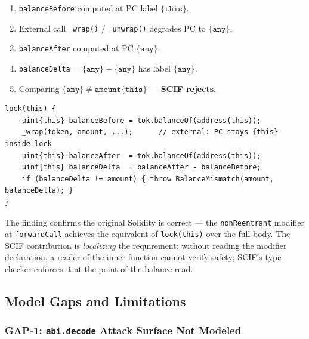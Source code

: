 \documentclass[11pt,a4paper]{article}
\begin{document}
\begin{enumerate}
  \item \texttt{balanceBefore} computed at PC label $\{\texttt{this}\}$.
  \item External call \texttt{\_wrap()} / \texttt{\_unwrap()} degrades PC to
    $\{\texttt{any}\}$.
  \item \texttt{balanceAfter} computed at PC $\{\texttt{any}\}$.
  \item \texttt{balanceDelta} = $\{\texttt{any}\} - \{\texttt{any}\}$ has
    label $\{\texttt{any}\}$.
  \item Comparing $\{\texttt{any}\} \neq \texttt{amount}\{\texttt{this}\}$ ---
    \textbf{SCIF rejects}.
\end{enumerate}

\begin{lstlisting}[style=scifstyle,caption={Lock scope must wrap the full read-call-read-check sequence.}]
lock(this) {
    uint{this} balanceBefore = tok.balanceOf(address(this));
    _wrap(token, amount, ...);      // external: PC stays {this} inside lock
    uint{this} balanceAfter  = tok.balanceOf(address(this));
    uint{this} balanceDelta  = balanceAfter - balanceBefore;
    if (balanceDelta != amount) { throw BalanceMismatch(amount, balanceDelta); }
}
\end{lstlisting}

The finding confirms the original Solidity is correct --- the \texttt{nonReentrant}
modifier at \texttt{forwardCall} achieves the equivalent of \texttt{lock(this)}
over the full body. The SCIF contribution is \emph{localizing} the requirement:
without reading the modifier declaration, a reader of the inner function cannot
verify safety; SCIF's type-checker enforces it at the point of the balance read.

\subsection{Model Gaps and Limitations}
\label{sec:gaps}

\subsubsection{GAP-1: \texttt{abi.decode} Attack Surface Not Modeled}
\label{sec:gap1}
\end{document}
